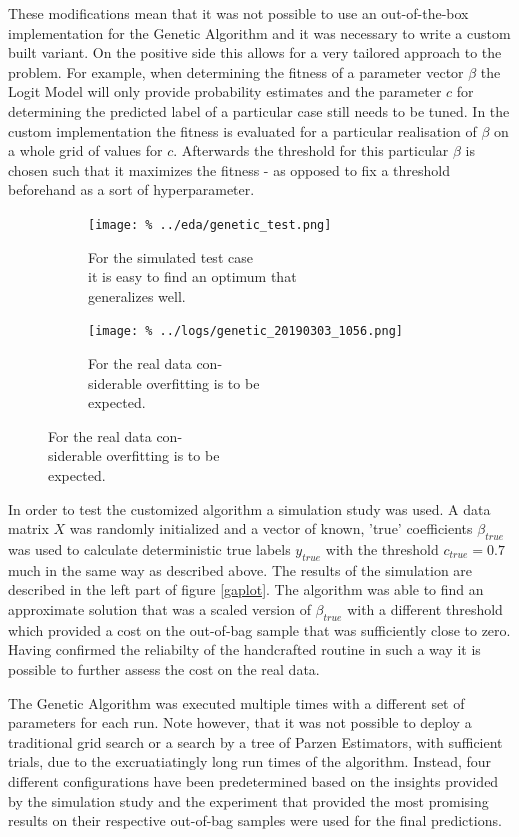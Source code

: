 These modifications mean that it was not possible to use an out-of-the-box implementation for the Genetic Algorithm and it was necessary to write a custom built variant. On the positive side this allows for a very tailored approach to the problem. For example, when determining the fitness of a parameter vector $\beta$ the Logit Model will only provide probability estimates and the parameter $c$ for determining the predicted label of a particular case still needs to be tuned. In the custom implementation the fitness is evaluated for a particular realisation of $\beta$ on a whole grid of values for $c$. Afterwards the threshold for this particular $\beta$ is chosen such that it maximizes the fitness - as opposed to fix a threshold beforehand as a sort of hyperparameter.

\begin{figure}
\centering
\caption{Results of the Genetic Algorithm}\label{gaplot}
\begin{subfigure}[b]{0.5\textwidth}            
            \texttt{[image: \%
            ../eda/genetic\_test.png]}
            \caption{For the simulated test case \\ %
                     it is easy to find an optimum that \\%
                     generalizes well.}
    \end{subfigure}%
    \begin{subfigure}[b]{0.5\textwidth}
            \centering
            \texttt{[image: \%
            ../logs/genetic\_20190303\_1056.png]}
            \caption{For the real data con-\\%
                     siderable overfitting is to be \\%
                     expected.}
    \end{subfigure}
\end{figure}


 In order to test the customized algorithm a simulation study was used. A data matrix $X$ was randomly initialized and a vector of known, 'true' coefficients $\beta_{true}$ was used to calculate deterministic true labels $y_{true}$ with the threshold $c_{true} = 0.7$ much in the same way as described above. The results of the simulation are described in the left part of figure \ref{gaplot}. The algorithm was able to find an approximate solution that was a scaled version of $\beta_{true}$ with a different threshold which provided a cost on the out-of-bag sample that was sufficiently close to zero. Having confirmed the reliabilty of the handcrafted routine in such a way it is possible to further assess the cost on the real data.

The Genetic Algorithm was executed multiple times with a different set of parameters for each run. Note however, that it was not possible to deploy a traditional grid search or a search by a tree of Parzen Estimators, with sufficient trials, due to the excruatiatingly long run times of the algorithm. Instead, four different configurations have been predetermined based on the insights provided by the simulation study and the experiment that provided the most promising results on their respective out-of-bag samples were used for the final predictions.
